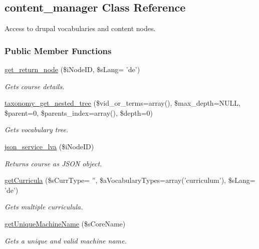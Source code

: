 \hypertarget{classcontent__manager}{\subsection{content\+\_\+manager Class Reference}
\label{classcontent__manager}
}


Access to drupal vocabularies and content nodes.  


\subsubsection*{Public Member Functions}
\begin{DoxyCompactItemize}
\item 
\hyperlink{classcontent__manager_a6732db58443e8a0948bcc7705f654c7a}{get\+\_\+return\+\_\+node} (\$i\+Node\+I\+D, \$s\+Lang= 'de')
\begin{DoxyCompactList}\small\item\em Gets course details. \end{DoxyCompactList}\item 
\hyperlink{classcontent__manager_acfeb4c387a22e750487e1bee5c73c1f9}{taxonomy\+\_\+get\+\_\+nested\+\_\+tree} (\$vid\+\_\+or\+\_\+terms=array(), \$max\+\_\+depth=N\+U\+L\+L, \$parent=0, \$parents\+\_\+index=array(), \$depth=0)
\begin{DoxyCompactList}\small\item\em Gets vocabulary tree. \end{DoxyCompactList}\item 
\hyperlink{classcontent__manager_a4f357170f7656cabf748245c46d7e8be}{json\+\_\+service\+\_\+lva} (\$i\+Node\+I\+D)
\begin{DoxyCompactList}\small\item\em Returns course as J\+S\+O\+N object. \end{DoxyCompactList}\item 
\hyperlink{classcontent__manager_a3c6667e24648fecc0ec3751318ac55bd}{get\+Curricula} (\$s\+Curr\+Type= '', \$a\+Vocabulary\+Types=array('curriculum'), \$s\+Lang= 'de')
\begin{DoxyCompactList}\small\item\em Gets multiple curriculula. \end{DoxyCompactList}\item 
\hyperlink{classcontent__manager_a5d110b5c929715c771e2d903951ef7ca}{get\+Unique\+Machine\+Name} (\$s\+Core\+Name)
\begin{DoxyCompactList}\small\item\em Gets a unique and valid machine name. \end{DoxyCompactList}\item 

\end{DoxyCompactItemize}
